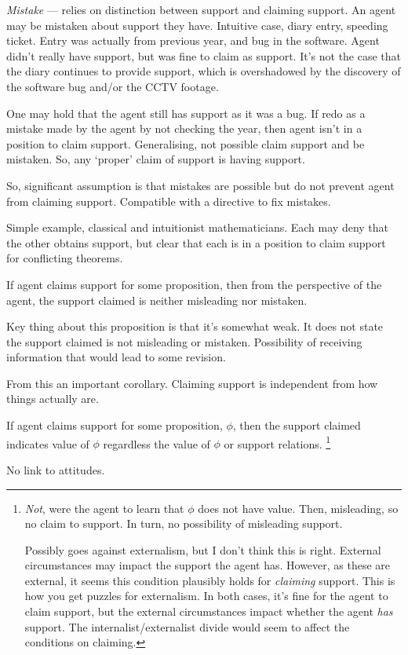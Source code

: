 \begin{note}[Mistaken]
  \emph{Mistake} --- relies on distinction between support and claiming support.
  An agent may be mistaken about support they have.
  Intuitive case, diary entry, speeding ticket.
  Entry was actually from previous year, and bug in the software.
  Agent didn't really have support, but was fine to claim as support.
  It's not the case that the diary continues to provide support, which is overshadowed by the discovery of the software bug and/or the CCTV footage.

  One may hold that the agent still has support as it was a bug.
  If redo as a mistake made by the agent by not checking the year, then agent isn't in a position to claim support.
  Generalising, not possible claim support and be mistaken.
  So, any `proper' claim of support is having support.

  So, significant assumption is that mistakes are possible but do not prevent agent from claiming support.
  Compatible with a directive to fix mistakes.

  Simple example, classical and intuitionist mathematicians.
  Each may deny that the other obtains support, but clear that each is in a position to claim support for conflicting theorems.

  \begin{note}[M \& M]
    If agent claims support for some proposition, then from the perspective of the agent, the support claimed is neither misleading nor mistaken.
  \end{note}

  Key thing about this proposition is that it's somewhat weak.
  It does not state the support claimed is not misleading or mistaken.
  Possibility of receiving information that would lead to some revision.

  From this an important corollary.
  Claiming support is independent from how things actually are.

  \begin{proposition}[\eiS{-} --- \eiS{}]\label{prop:supp:independence}
    If agent claims support for some proposition, \(\phi\), then the support claimed indicates value of \(\phi\) regardless the value of \(\phi\) or support relations.\nolinebreak
    \footnote{
      \emph{Not}, were the agent to learn that \(\phi\) does not have value.
      Then, misleading, so no claim to support.
      In turn, no possibility of misleading support.

      Possibly goes against externalism, but I don't think this is right.
      External circumstances may impact the support the agent has.
      However, as these are external, it seems this condition plausibly holds for \emph{claiming} support.
      This is how you get puzzles for externalism.
      In both cases, it's fine for the agent to claim support, but the external circumstances impact whether the agent \emph{has} support.
      The internalist/externalist divide would seem to affect the conditions on claiming.
    }
  \end{proposition}

  No link to attitudes.
\end{note}

